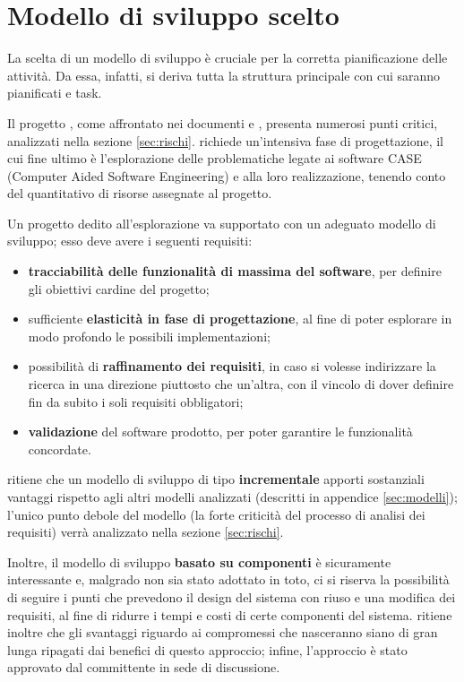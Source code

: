 
\section{Modello di sviluppo scelto} \label{sec:modscelto}

La scelta di un modello di sviluppo è cruciale per la corretta pianificazione delle attività. Da essa, infatti, si deriva tutta la struttura principale con cui saranno pianificati  e task.

Il progetto \proj, come affrontato nei documenti \SdF{} e \PdQ, presenta numerosi punti critici, analizzati nella sezione \ref{sec:rischi}. \proj{} richiede un'intensiva fase di progettazione, il cui fine ultimo è l'esplorazione delle problematiche legate ai software CASE (Computer Aided Software Engineering) e alla loro realizzazione, tenendo conto del quantitativo di risorse assegnate al progetto. %

Un progetto dedito all'esplorazione va supportato con un adeguato modello di sviluppo; esso deve avere i seguenti requisiti:
\begin{itemize}
	\item \textbf{tracciabilità delle funzionalità di massima del software}, per definire gli obiettivi cardine del progetto;
	\item sufficiente \textbf{elasticità in fase di progettazione}, al fine di poter esplorare in modo profondo le possibili implementazioni;
	\item possibilità di \textbf{raffinamento dei requisiti}, in caso si volesse indirizzare la ricerca in una direzione piuttosto che un'altra, con il vincolo di dover definire fin da subito i soli requisiti obbligatori;
	\item \textbf{validazione} del software prodotto, per poter garantire le funzionalità concordate.
\end{itemize}

\hx{} ritiene che un modello di sviluppo di tipo \textbf{incrementale} apporti sostanziali vantaggi rispetto agli altri modelli analizzati (descritti in appendice \ref{sec:modelli}); l'unico punto debole del modello (la forte criticità del processo di analisi dei requisiti) verrà analizzato nella sezione \ref{sec:rischi}.

Inoltre, il modello di sviluppo \textbf{basato su componenti} è sicuramente interessante e, malgrado non sia stato adottato in toto, ci si riserva la possibilità di seguire i punti che prevedono il design del sistema con riuso e una modifica dei requisiti, al fine di ridurre i tempi e costi di certe componenti del sistema. \hx{} ritiene inoltre che gli svantaggi riguardo ai compromessi che nasceranno siano di gran lunga ripagati dai benefici di questo approccio; infine, l'approccio è stato approvato dal committente in sede di discussione.





